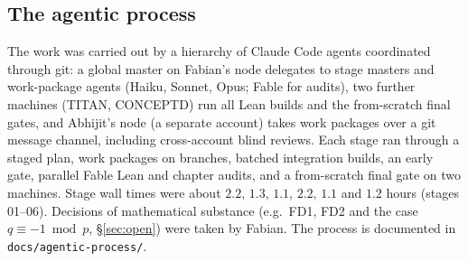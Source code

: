 \subsection{The agentic process}
The work was carried out by a hierarchy of Claude Code agents coordinated through git: a global master on Fabian's node
delegates to stage masters and work-package agents (Haiku, Sonnet, Opus; Fable for audits), two further machines (TITAN,
CONCEPTD) run all Lean builds and the from-scratch final gates, and Abhijit's node (a separate account) takes work
packages over a git message channel, including cross-account blind reviews. Each stage ran through a staged plan, work
packages on branches, batched integration builds, an early gate, parallel Fable Lean and chapter audits, and a
from-scratch final gate on two machines. Stage wall times were about $2.2$, $1.3$, $1.1$, $2.2$, $1.1$ and $1.2$ hours
(stages 01--06). Decisions of mathematical substance (e.g.\ FD1, FD2 and the case $q\equiv-1\bmod p$, \S\ref{sec:open}) were
taken by Fabian. The process is documented in \texttt{docs/agentic-process/}.

